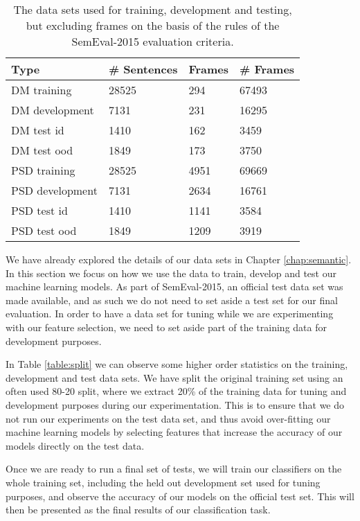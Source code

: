 \begin{table}
    \centering
    \smaller[0.2]
    \begin{tabular}{@{}llll@{}}
        \toprule
        \textbf{Type} & \textbf{\# Sentences} & \textbf{Frames} & \textbf{\# Frames} \\
        \midrule
        DM training & 28525 & 294 & 67493 \\
        DM development & 7131 & 231 & 16295 \\
        DM test id & 1410 & 162 & 3459 \\
        DM test ood & 1849 & 173 & 3750 \\
        \midrule
        PSD training & 28525 & 4951 & 69669 \\
        PSD development & 7131 & 2634 & 16761 \\
        PSD test id & 1410 & 1141 & 3584 \\
        PSD test ood & 1849  & 1209 & 3919 \\
        \bottomrule
    \end{tabular}
    \caption{The data sets used for training, development and testing, but excluding frames on the basis of the rules of the SemEval-2015 evaluation criteria.}
    \label{table:split:VandPred}
\end{table}


We have already explored the details of our data sets in Chapter \ref{chap:semantic}. In this section we focus on how we use the data to train, develop and test our machine learning models. As part of SemEval-2015, an official test data set was made available, and as such we do not need to set aside a test set for our final evaluation. In order to have a data set for tuning while we are experimenting with our feature selection, we need to set aside part of the training data for development purposes.

In Table \ref{table:split} we can observe some higher order statistics on the training, development and test data sets. We have split the original training set using an often used 80-20 split, where we extract 20\% of the training data for tuning and development purposes during our experimentation. This is to ensure that we do not run our experiments on the test data set, and thus avoid over-fitting our machine learning models by selecting features that increase the accuracy of our models directly on the test data.

Once we are ready to run a final set of tests, we will train our classifiers on the whole training set, including the held out development set used for tuning purposes, and observe the accuracy of our models on the official test set. This will then be presented as the final results of our classification task.

